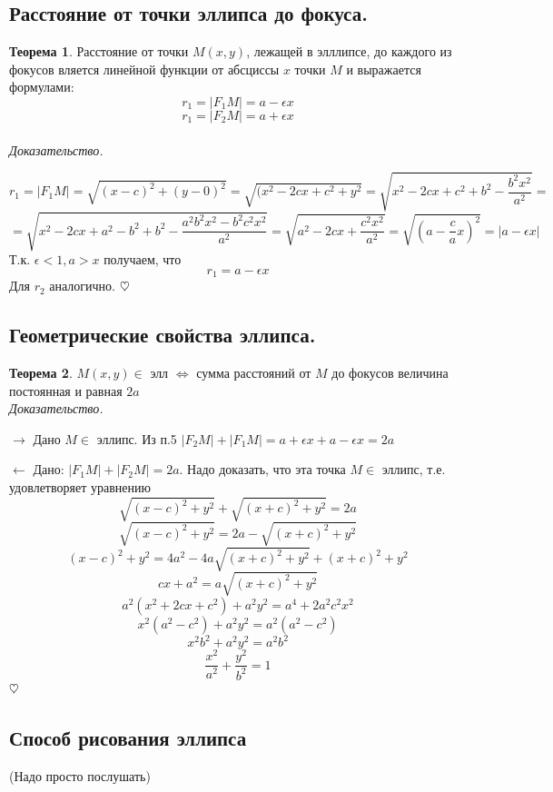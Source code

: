 \documentclass{article}
\theoremstyle{definition}
\newtheorem{theorem}{Теорема}[section]
\newenvironment{ourproof}{\textit{\\ Доказательство.\\ }}{$\hfill \heartsuit$}
\begin{document}
\subsection{Расстояние от точки эллипса до фокуса.} 

\begin{theorem}

 Расстояние от точки $M(x, y)$, лежащей в  элллипсе, до каждого из фокусов вляется линейной функции от абсциссы $x$ точки $M$ и выражается формулами:
$$r_1 = |F_1 M| = a - \epsilon x $$
$$r_1 = |F_2 M| = a + \epsilon x $$
\begin{ourproof}{}

$$r_1 = |F_1 M| = \sqrt{(x - c)^2 + (y - 0)^2} = \sqrt{(x^2 - 2 c x + c^2 + y^2} = \sqrt{x^2 - 2 c x + c^2 + b^2 - \frac{b^2 x^2}{a^2}} = $$
$$= \sqrt{x^2 - 2 c x + a^2 - b^2 + b^2 - \frac{a^2 b^2 x^2 - b^2 c^2 x^2}{a^2}} = \sqrt{a^2 - 2 c x + \frac{c^2 x^2}{a^2}} = \sqrt{(a - \frac{c}{a} x)^2} = |a - \epsilon x|$$
Т.к. $\epsilon < 1, a > x$ получаем, что 
$$r_1 = a - \epsilon x$$ 
Для $r_2$ аналогично. 
\end{ourproof}
\end{theorem}

\subsection{Геометрические свойства эллипса.}
\begin{theorem}

 $M(x, y) \in $ элл  $\Leftrightarrow$ сумма расстояний от $M$ до фокусов величина постоянная и равная $2 a$
\begin{ourproof}{}

$\rightarrow$ Дано $M \in $ эллипс. Из п.5 $|F_2 M| + |F_1 M| = a + \epsilon x + a - \epsilon x = 2a$

$\leftarrow$ Дано: $|F_1 M| + |F_2 M| = 2 a$. Надо доказать, что эта точка $M \in $ эллипс, т.е. удовлетворяет уравнению
$$\sqrt{(x - c)^2 + y^2} + \sqrt{(x + c) ^ 2 + y^2} = 2 a $$
$$\sqrt{(x - c)^2 + y^2} = 2 a - \sqrt{(x + c) ^ 2 + y^2} $$
$$(x - c)^2 + y^2 = 4 a^2 - 4 a \sqrt{(x+c)^2 + y^2} + (x + c)^2 + y^2 $$
$$c x + a^2 = a \sqrt{(x + c)^2 + y^2} $$
$$a^2 (x^2 + 2 c x + c^2) + a^2 y^2 = a^4 + 2 a^2 c^2 x^2 $$
$$x^2 (a^2 - c^2) + a^2 y^2 = a^2 (a^2 - c^2) $$
$$x^2 b^2 + a^2 y^2 = a^2 b^2 $$
$$\frac{x^2}{a^2} + \frac{y^2}{b^2} = 1$$
\end{ourproof}
\end{theorem}

\subsection{Способ рисования эллипса} 
(Надо просто послушать)
\end{document}
